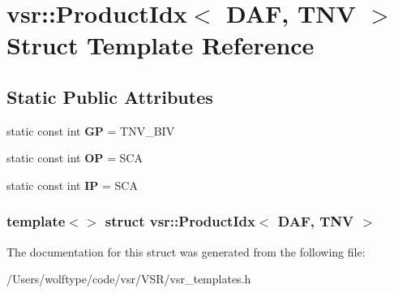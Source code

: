 \hypertarget{structvsr_1_1_product_idx_3_01_d_a_f_00_01_t_n_v_01_4}{\section{vsr\-:\-:Product\-Idx$<$ D\-A\-F, T\-N\-V $>$ Struct Template Reference}
\label{structvsr_1_1_product_idx_3_01_d_a_f_00_01_t_n_v_01_4}
}
\subsection*{Static Public Attributes}
\begin{DoxyCompactItemize}
\item 
\hypertarget{structvsr_1_1_product_idx_3_01_d_a_f_00_01_t_n_v_01_4_af9cdcc29a283bce47e9ded2a7a4afa5e}{static const int {\bfseries G\-P} = T\-N\-V\-\_\-\-B\-I\-V}\label{structvsr_1_1_product_idx_3_01_d_a_f_00_01_t_n_v_01_4_af9cdcc29a283bce47e9ded2a7a4afa5e}

\item 
\hypertarget{structvsr_1_1_product_idx_3_01_d_a_f_00_01_t_n_v_01_4_aa3ddfc45ecd1c0c2bcba3184394f542a}{static const int {\bfseries O\-P} = S\-C\-A}\label{structvsr_1_1_product_idx_3_01_d_a_f_00_01_t_n_v_01_4_aa3ddfc45ecd1c0c2bcba3184394f542a}

\item 
\hypertarget{structvsr_1_1_product_idx_3_01_d_a_f_00_01_t_n_v_01_4_a42d3c4c462b6c414370305af39abedf7}{static const int {\bfseries I\-P} = S\-C\-A}\label{structvsr_1_1_product_idx_3_01_d_a_f_00_01_t_n_v_01_4_a42d3c4c462b6c414370305af39abedf7}

\end{DoxyCompactItemize}
\subsubsection*{template$<$$>$ struct vsr\-::\-Product\-Idx$<$ D\-A\-F, T\-N\-V $>$}



The documentation for this struct was generated from the following file\-:\begin{DoxyCompactItemize}
\item 
/\-Users/wolftype/code/vsr/\-V\-S\-R/vsr\-\_\-templates.\-h\end{DoxyCompactItemize}

